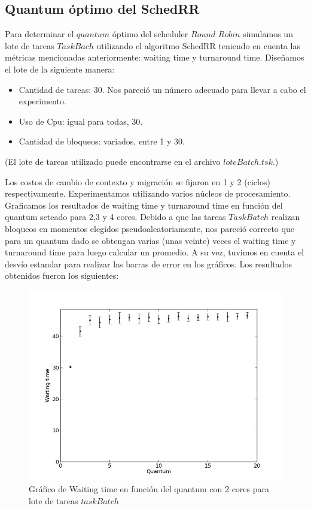 \subsection{Quantum óptimo del SchedRR}

Para determinar el $quantum$ óptimo del scheduler $Round$ $Robin$ simulamos un lote de tareas $TaskBach$ utilizando el algoritmo SchedRR teniendo en cuenta las métricas mencionadas anteriormente: waiting time y turnaround time. Diseñamos el lote de la siguiente manera:
\begin{itemize}
	\item Cantidad de tareas: 30. Nos pareció un número adecuado para llevar a cabo el experimento.
	\item Uso de Cpu: igual para todas, 30.
	\item Cantidad de bloqueos: variados, entre 1 y 30.
\end{itemize}
(El lote de tareas utilizado puede encontrarse en el archivo $loteBatch.tsk$.)

Los costos de cambio de contexto y migración se fijaron en 1 y 2 (ciclos) respectivamente. Experimentamos utilizando varios núcleos de procesamiento.
Graficamos los resultados de waiting time y turnaround time en función del quantum seteado para 2,3 y 4 cores. Debido a que las tareas $TaskBatch$ realizan bloqueos en momentos elegidos pseudoaleatoriamente, nos pareció correcto que para un quantum dado se obtengan varias (unas veinte) veces el waiting time y turnaround time para luego calcular un promedio. A su vez, tuvimos en cuenta el desvío estandar para realizar las barras de error en los gráficos. Los resultados obtenidos fueron los siguientes:

\begin{figure}[H]
	\begin{center}
		  \includegraphics[scale=0.3]{graficos/cores_2_wt.jpg}
		  \caption{Gráfico de Waiting time en función del quantum con 2 cores para lote de tareas $taskBatch$}
		  \label{fig:contra1}
	\end{center}
\end{figure}

